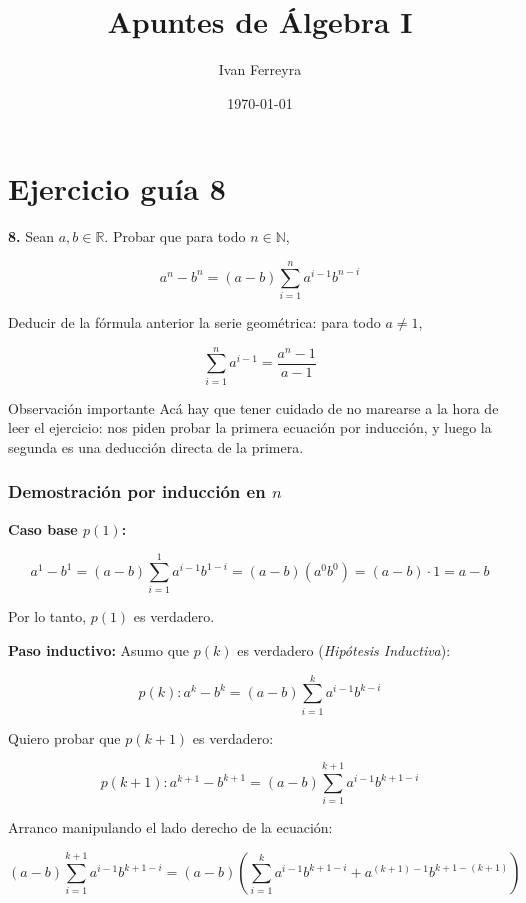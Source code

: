 \documentclass[11pt]{article}
\title{\textbf{Apuntes de Álgebra I}}
\author{Ivan Ferreyra}
\date{\today}
\begin{document}
\maketitle

\vspace{0.5cm}

\section{Ejercicio guía 8}

\textbf{8.} Sean $a, b \in \mathbb{R}$. Probar que para todo $n \in \mathbb{N}$,

\[
a^n - b^n = (a-b)\sum_{i=1}^{n} a^{i-1}b^{n-i}
\]

Deducir de la fórmula anterior la serie geométrica: para todo $a \neq 1$,

\[
\sum_{i=1}^{n} a^{i-1} = \frac{a^{n}-1}{a-1}
\]

\begin{mynote}{Observación importante}
Acá hay que tener cuidado de no marearse a la hora de leer el ejercicio: nos piden probar la primera ecuación por inducción, y luego la segunda es una deducción directa de la primera.
\end{mynote}

\subsubsection*{Demostración por inducción en $n$}

\textbf{Caso base $p(1)$:}

\[
a^1 - b^1 = (a-b)\sum_{i=1}^{1} a^{i-1}b^{1-i} = (a-b)(a^0 b^0) = (a-b) \cdot 1 = a - b
\]

Por lo tanto, $p(1)$ es verdadero.

\vspace{0.3cm}

\textbf{Paso inductivo:} Asumo que $p(k)$ es verdadero (\textit{Hipótesis Inductiva}):

\[
p(k): a^k - b^k = (a-b)\sum_{i=1}^{k} a^{i-1}b^{k-i}
\]

Quiero probar que $p(k+1)$ es verdadero:

\[
p(k+1): a^{k+1} - b^{k+1} = (a-b)\sum_{i=1}^{k+1} a^{i-1}b^{k+1-i}
\]

Arranco manipulando el lado derecho de la ecuación:

\[
(a-b)\sum_{i=1}^{k+1} a^{i-1}b^{k+1-i} = (a-b) \left( \sum_{i=1}^{k} a^{i-1}b^{k+1-i} + a^{(k+1)-1}b^{k+1-(k+1)} \right)
\]
\end{document}
